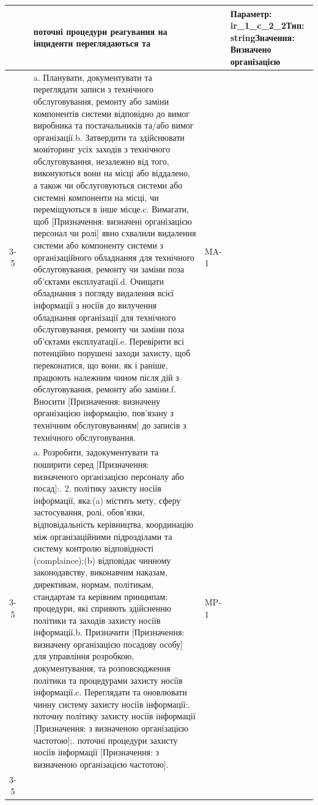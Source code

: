 \documentclass[10pt]{article}
\begin{document}
\begin{longtable}{|c|>{\raggedright\arraybackslash}p{4cm}|>{\raggedright\arraybackslash}p{6cm}|>{\raggedright\arraybackslash}p{1.5cm}|>{\raggedright\arraybackslash}p{3.5cm}|}
 &  & поточні процедури реагування на інциденти переглядаються та &  & Параметр: ir\_\allowbreak{}1\_\allowbreak{}c\_\allowbreak{}2\_\allowbreak{}2\newline Тип: string\newline Значення: \textbf{Визначено організацією} \\ \cline{3-5}
 &  & a. Планувати, документувати та переглядати записи з технічного обслуговування, ремонту або заміни компонентів системи відповідно до вимог виробника та постачальників та/або вимог організації.\newline b. Затвердити та здійснювати моніторинг усіх заходів з технічного обслуговування, незалежно від того, виконуються вони на місці або віддалено, а також чи обслуговуються системи або системні компоненти на місці, чи переміщуються в інше місце.\newline c. Вимагати, щоб [Призначення: визначені організацією персонал чи ролі] явно схвалили видалення системи або компоненту системи з організаційного обладнання для технічного обслуговування, ремонту чи заміни поза об'єктами експлуатації.\newline d. Очищати обладнання з погляду видалення всієї інформації з носіїв до вилучення обладнання організації для технічного обслуговування, ремонту чи заміни поза об'єктами експлуатації.\newline e. Перевірити всі потенційно порушені заходи захисту, щоб переконатися, що вони, як і раніше, працюють належним чином після дій з обслуговування, ремонту або заміни.\newline f. Вносити [Призначення: визначену організацією інформацію, пов'язану з технічним обслуговуванням] до записів з технічного обслуговування. & MA-1 & \\ \cline{3-5}
 &  & a. Розробити, задокументувати та поширити серед [Призначення: визначеного організацією персоналу або посад]:\newline 1. 2. політику захисту носіїв інформації, яка:\newline (a) містить мету, сферу застосування, ролі, обов'язки, відповідальність керівництва, координацію між організаційними підрозділами та систему контролю відповідності (complaince);\newline (b) відповідає чинному законодавству, виконавчим наказам, директивам, нормам, політикам, стандартам та керівним принципам; процедури, які сприяють здійсненню політики та заходів захисту носіїв інформації.\newline b. Призначити [Призначення: визначену організацією посадову особу] для управління розробкою, документування, та розповсюдження політики та процедурами захисту носіїв інформації.\newline c. Переглядати та оновлювати чинну систему захисту носіїв інформації:\newline 1. поточну політику захисту носіїв інформації [Призначення: з визначеною організацією частотою];\newline 2. поточні процедури захисту носіїв інформації [Призначення: з визначеною організацією частотою]. & MP-1 & \\ \cline{3-5}

\end{longtable}
\end{document}

